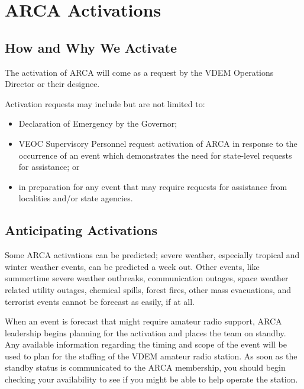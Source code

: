 \documentclass[pdflatex,letterpaper,twoside,12pt]{book}
\begin{document}
\chapter{ARCA Activations}

\section{How and Why We Activate}

The activation of ARCA will come as a request by the VDEM Operations Director or their designee.

Activation requests may include but are not limited to:

\begin{itemize}
	\item Declaration of Emergency by the Governor;
	\item VEOC Supervisory Personnel request activation of ARCA in response to the occurrence of an event which demonstrates the need for state-level requests for assistance; or
	\item in preparation for any event that may require requests for assistance from localities and/or state agencies.
\end{itemize}


\section{Anticipating Activations}

Some ARCA activations can be predicted; severe weather, especially tropical and winter weather events, can be predicted a week out.  Other events, like summertime severe weather outbreaks, communication outages, space weather related utility outages, chemical spills, forest fires, other mass evacuations, and terrorist events cannot be forecast as easily, if at all.

When an event is forecast that might require amateur radio support, ARCA leadership begins planning for the activation and places the team on standby.  Any available information regarding the timing and scope of the event will be used to plan for the staffing of the VDEM amateur radio station.  As soon as the standby status is communicated to the ARCA membership, you should begin checking your availability to see if you might be able to help operate the station.
\end{document}

